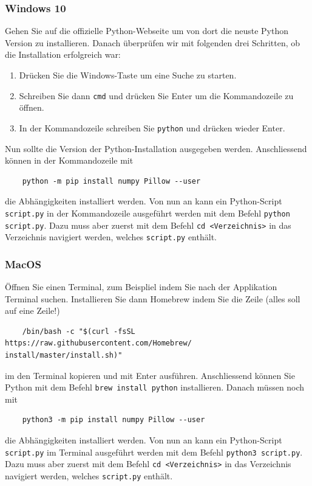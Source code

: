\documentclass[12pt,a4paper]{article}
\theoremstyle{definition}
\theoremstyle{definition}
\begin{document}
\subsubsection*{Windows 10}
Gehen Sie auf die offizielle Python-Webseite um von dort die neuste Python Version zu installieren.
Danach überprüfen wir mit folgenden drei Schritten, ob die Installation erfolgreich war:
\begin{enumerate}
	\item Drücken Sie die Windows-Taste um eine Suche zu starten.
	\item Schreiben Sie dann \texttt{cmd} und drücken Sie Enter um die Kommandozeile zu öffnen.
	\item In der Kommandozeile schreiben Sie \texttt{python} und drücken wieder Enter.
\end{enumerate}
Nun sollte die Version der Python-Installation ausgegeben werden.
Anschliessend können in der Kommandozeile mit
\begin{verbatim}
	python -m pip install numpy Pillow --user
\end{verbatim}
die Abhängigkeiten installiert werden.
Von nun an kann ein Python-Script \texttt{script.py} in der Kommandozeile ausgeführt werden mit dem Befehl \texttt{python script.py}.
Dazu muss aber zuerst mit dem Befehl \texttt{cd <Verzeichnis>} in das Verzeichnis navigiert werden, welches \texttt{script.py} enthält.

\subsubsection*{MacOS}
Öffnen Sie einen Terminal, zum Beispliel indem Sie nach der Applikation Terminal suchen.
Installieren Sie dann Homebrew indem Sie die Zeile (alles soll auf eine Zeile!)
\begin{verbatim}
	/bin/bash -c "$(curl -fsSL https://raw.githubusercontent.com/Homebrew/
install/master/install.sh)"
\end{verbatim}
im den Terminal kopieren und mit Enter ausführen.
Anschliessend können Sie Python mit dem Befehl \texttt{brew install python} installieren.
Danach müssen noch mit
\begin{verbatim}
	python3 -m pip install numpy Pillow --user
\end{verbatim}
die Abhängigkeiten installiert werden.
Von nun an kann ein Python-Script \texttt{script.py} im Terminal ausgeführt werden mit dem Befehl \texttt{python3 script.py}.
Dazu muss aber zuerst mit dem Befehl \texttt{cd <Verzeichnis>} in das Verzeichnis navigiert werden, welches \texttt{script.py} enthält.
\end{document}
